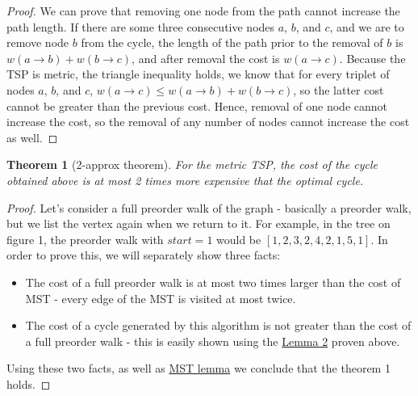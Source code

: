 \documentclass[12pt,twoside,notitlepage]{report}
\newtheorem{theorem}{Theorem}
\begin{document}
\begin{proof}

We can prove that removing one node from the path cannot increase the path length. If there are some three consecutive nodes $a$, $b$, and $c$, and we are to remove node $b$ from the cycle, the length of the path prior to the removal of $b$ is $w(a \rightarrow b) + w(b \rightarrow c)$, and after removal the cost is $w(a \rightarrow c)$. Because the TSP is metric, the triangle inequality holds, we know that for every triplet of nodes $a$, $b$, and $c$, $w(a \rightarrow c) \leq w(a \rightarrow b) + w(b \rightarrow c)$, so the latter cost cannot be greater than the previous cost. Hence, removal of one node cannot increase the cost, so the removal of any number of nodes cannot increase the cost as well.

\end{proof}


\begin{theorem}[2-approx theorem]

For the metric TSP, the cost of the cycle obtained above is at most 2 times more expensive that the optimal cycle. \\

\end{theorem}

\begin{proof}

Let's consider a full preorder walk  of the graph - basically a preorder walk, but we list the vertex again when we return to it. For example, in the tree on figure 1, the preorder walk with $start = 1$ would be $[1, 2, 3, 2, 4, 2, 1, 5, 1]$. In order to prove this, we will separately show three facts:

\begin{itemize}

\item The cost of a full preorder walk is at most two times larger than the cost of MST - every edge of the MST is visited at most twice.

\item The cost of a cycle generated by this algorithm is not greater than the cost of a full preorder walk - this is easily shown using the \hyperref[shortcutting]{Lemma 2} proven above.

\end{itemize}

Using these two facts, as well as \hyperref[mstlemma]{MST lemma} we conclude that the theorem 1 holds.

\end{proof}
\end{document}
